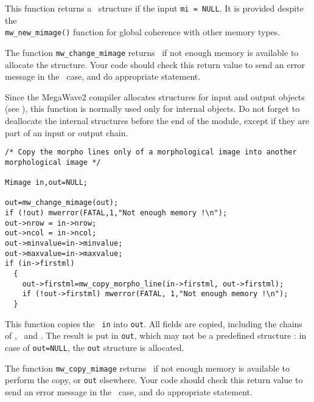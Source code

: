 \Description
This function returns a \mimage\ structure if the input \verb+mi = NULL+.
It is provided despite the \\
\verb+mw_new_mimage()+ function for
global coherence with other memory types.

The function \verb+mw_change_mimage+ returns \Null\ if not enough memory is available to allocate the structure. 
Your code should check this return value to send an error message in the \Null\ case, and do appropriate statement.

Since the MegaWave2 compiler allocates structures for input and output 
objects (see \volI), this function is normally used only for internal objects.
Do not forget to deallocate the internal structures before the end
of the module, except if they are part of an input or output chain.

\Next
\Example
\begin{verbatim}
/* Copy the morpho lines only of a morphological image into another morphological image */

Mimage in,out=NULL;

out=mw_change_mimage(out);
if (!out) mwerror(FATAL,1,"Not enough memory !\n");
out->nrow = in->nrow;
out->ncol = in->ncol;
out->minvalue=in->minvalue;
out->maxvalue=in->maxvalue;
if (in->firstml) 
  {
    out->firstml=mw_copy_morpho_line(in->firstml, out->firstml);
    if (!out->firstml) mwerror(FATAL, 1,"Not enough memory !\n");
  }
\end{verbatim}

\newpage %


\Description
This function copies the \mimage\ \verb+in+ into \verb+out+.
All fields are copied, including the chains of \msets, \mline\ and \fmline.
The result is put in \verb+out+, which may not be a predefined structure : in case 
of \verb+out=NULL+, the \verb+out+ structure is allocated.

The function \verb+mw_copy_mimage+ returns \Null\ if not enough memory is available to perform
the copy, or \verb+out+ elsewhere.
Your code should check this return value to send an error message in the \Null\ case, and do appropriate statement.

